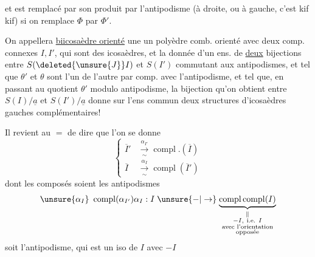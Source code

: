 et est remplacé par son produit par l'antipodisme
(à droite, ou à gauche, c'est kif kif) si on remplace
$\Phi$ par $\Phi'$.

On appellera \uline{biicosaèdre orienté} une 
 un polyèdre comb. orienté avec
deux comp. connexes $I,I'$, qui sont
des icosaèdres, et la donnée d'un ens. 
de \uline{deux} bijections  entre $S(\deleted{\unsure{J}}I)$ et $S(I')$
commutant aux antipodismes, et
 tel que $\theta'$ et $\theta$ sont  l'un de
l'autre par comp. avec l'antipodisme,
et tel que, en passant au quotient 
 $\theta'$ modulo antipodisme, la
bijection qu'on obtient entre $S(I)/\underline a$ et $S(I')/\underline a$
donne sur l'ens commun deux structures
d'icosaèdres gauches  complémentaires!

Il revient au $=$ de dire que l'on se donne
\[
\left\{\begin{aligned}
\overline I'&\xrightarrow[\sim]{\alpha_{I'}}\operatorname{compl}.(\overline I)\\
\overline I&\xrightarrow[\sim]{\alpha_I}\operatorname{compl}(\overline I')
\end{aligned}\right.
\]
dont les composés soient les antipodismes
\[
\unsure{\alpha_I}\ \operatorname{compl}(\alpha_{I'})\alpha_I:
I\mathrel{\unsure{-|\to}}\underbrace{\operatorname{compl}\operatorname{compl}(I)}_{
\substack{\Vert\\-I,\ \text{i.e. }I\\\text{avec l'orientation}\\\text{opposée}}}
\]
soit l'antipodisme, qui est un
iso de $I$ avec $-I$
